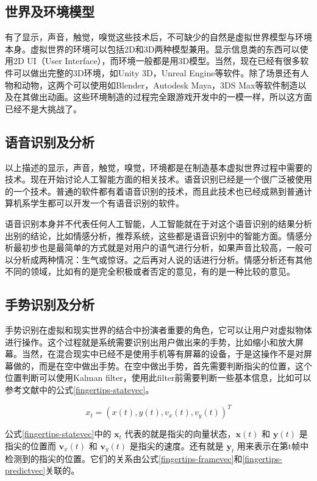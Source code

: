 \documentclass{llncs}
\begin{document}
\subsection{世界及环境模型}
有了显示，声音，触觉，嗅觉这些技术后，不可缺少的自然是虚拟世界模型与环境本身。虚拟世界的环境可以包括2D和3D两种模型兼用。显示信息类的东西可以使用2D UI（User Interface），而环境一般都是用3D模型。当然，现在已经有很多软件可以做出完整的3D环境，如Unity 3D\cite{kim2014using}，Unreal Engine等软件。除了场景还有人物和动物，这两个可以使用如Blender\cite{hess2007essential}，Autodesk Maya\cite{derakhshani2012introducing}，3DS Max\cite{derakhshani2012autodesk}等软件制造以及在其做出动画。这些环境制造的过程完全跟游戏开发中的一模一样，所以这方面已经不是大挑战了。

\subsection{语音识别及分析}
以上描述的显示，声音，触觉，嗅觉，环境都是在制造基本虚拟世界过程中需要的技术。现在开始讨论人工智能方面的相关技术。语音识别已经是一个很广泛被使用的一个技术。普通的软件都有着语音识别的技术，而且此技术也已经成熟到普通计算机系学生都可以开发一个有语音识别的软件。

语音识别本身并不代表任何人工智能，人工智能就在于对这个语音识别的结果分析出别的结论，比如情感分析，推荐系统，这些都是语音识别中的智能方面。情感分析最初步也是最简单的方式就是对用户的语气进行分析，如果声音比较高，一般可以分析成两种情况：生气或惊讶。之后再对人说的话进行分析。情感分析还有其他不同的领域，比如有的是完全积极或者否定的意见，有的是一种比较的意见\cite{liu2012sentiment}。

\subsection{手势识别及分析}
手势识别在虚拟和现实世界的结合中扮演者重要的角色，它可以让用户对虚拟物体进行操作。这个过程就是系统需要识别出用户做出来的手势，比如缩小和放大屏幕。当然，在混合现实中已经不是使用手机等有屏幕的设备，于是这操作不是对屏幕做的，而是在空中做出手势。在空中做出手势，首先需要判断指尖的位置，这个位置判断可以使用Kalman filter，使用此filter前需要判断一些基本信息，比如可以参考文献\cite{oka2002real}中的公式\ref{fingertips-statevec}。

\begin{equation}\label{fingertips-statevec}
x_{t} = (x(t), y(t), v_{x}(t), v_{y}(t))^{T}
\end{equation}

公式\ref{fingertips-statevec}中的 $\mathbf{x}_{t}$ 代表的就是指尖的向量状态，$\mathbf{x}(t)$ 和 $\mathbf{y}(t)$ 是指尖的位置而 $\mathbf{v}_{x}(t)$ 和 $\mathbf{v}_{y}(t)$ 是指尖的速度。还有就是 $\mathbf{y}_{t}$ 用来表示在第t帧中检测到的指尖的位置。它们的关系由公式\ref{fingertips-framevec}和\ref{fingertips-predictvec}关联的。
\end{document}
